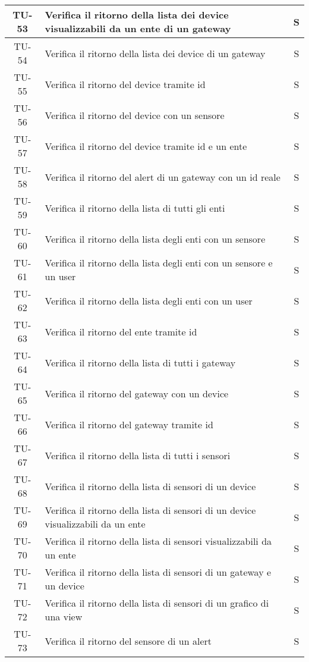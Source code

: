 \begin{center}
\begin{longtable}{|c|p{12cm}|c|}
			\hline
			TU-53 & Verifica il ritorno della lista dei device visualizzabili da un ente di un gateway & S \\
			\hline
			TU-54 & Verifica il ritorno della lista dei device di un gateway & S \\
			\hline
			TU-55 & Verifica il ritorno del device tramite id & S \\
			\hline
			TU-56 & Verifica il ritorno del device con un sensore & S \\
			\hline
			TU-57 & Verifica il ritorno del device tramite id e un ente & S \\
			\hline
			TU-58 & Verifica il ritorno del alert di un gateway con un id reale & S \\
			\hline
			TU-59 & Verifica il ritorno della lista di tutti gli enti & S \\
			\hline
			TU-60 & Verifica il ritorno della lista degli enti con un sensore & S \\
			\hline
			TU-61 & Verifica il ritorno della lista degli enti con un sensore e un user & S \\
			\hline
			TU-62 & Verifica il ritorno della lista degli enti con un user & S \\
			\hline
			TU-63 & Verifica il ritorno del ente tramite id & S \\
			\hline
			TU-64 & Verifica il ritorno della lista di tutti i gateway & S \\
			\hline
			TU-65 & Verifica il ritorno del gateway con un device & S \\
			\hline
			TU-66 & Verifica il ritorno del gateway tramite id & S \\
			\hline
			TU-67 & Verifica il ritorno della lista di tutti i sensori & S \\
			\hline
			TU-68 & Verifica il ritorno della lista di sensori di un device & S \\
			\hline
			TU-69 & Verifica il ritorno della lista di sensori di un device visualizzabili da un ente & S \\
			\hline
			TU-70 & Verifica il ritorno della lista di sensori visualizzabili da un ente & S \\
			\hline
			TU-71 & Verifica il ritorno della lista di sensori di un gateway e un device & S \\
			\hline
			TU-72 & Verifica il ritorno della lista di sensori di un grafico di una view & S \\
			\hline
			TU-73 & Verifica il ritorno del sensore di un alert & S \\

\end{longtable}
\end{center}
